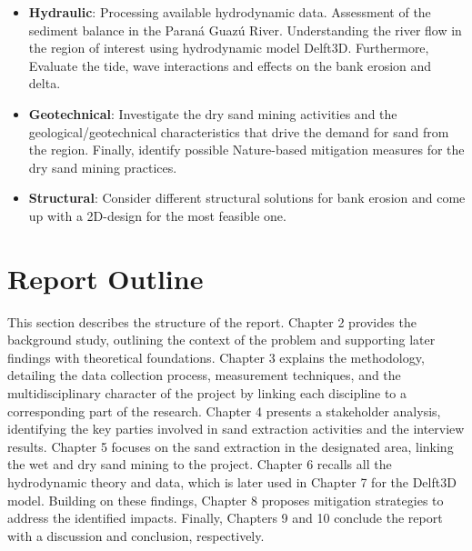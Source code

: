 \begin{itemize}
    \item \textbf{Hydraulic}: 
    Processing available hydrodynamic data.
    Assessment of the sediment balance in the Paraná Guazú River.
    Understanding the river flow in the region of interest using hydrodynamic model Delft3D. Furthermore, Evaluate the tide, wave interactions and effects on the bank erosion and delta. 
    
    \item \textbf{Geotechnical}: 
    Investigate the dry sand mining activities and the geological/geotechnical characteristics that drive the demand for sand from the region. Finally, identify possible Nature-based mitigation measures for the dry sand mining practices.
    \item \textbf{Structural}: Consider different structural solutions for bank erosion and come up with a 2D-design for the most feasible one.
\end{itemize}

\section{Report Outline}
\label{section: report outline}
This section describes the structure of the report. Chapter 2 provides the background study, outlining the context of the problem and supporting later findings with theoretical foundations. Chapter 3 explains the methodology, detailing the data collection process, measurement techniques, and the multidisciplinary character of the project by linking each discipline to a corresponding part of the research. Chapter 4 presents a stakeholder analysis, identifying the key parties involved in sand extraction activities and the interview results. Chapter 5 focuses on the sand extraction in the designated area, linking the wet and dry sand mining to the project. Chapter 6 recalls all the hydrodynamic theory and data, which is later used in Chapter 7 for the Delft3D model. Building on these findings, Chapter 8 proposes mitigation strategies to address the identified impacts. Finally, Chapters 9 and 10 conclude the report with a discussion and conclusion, respectively.